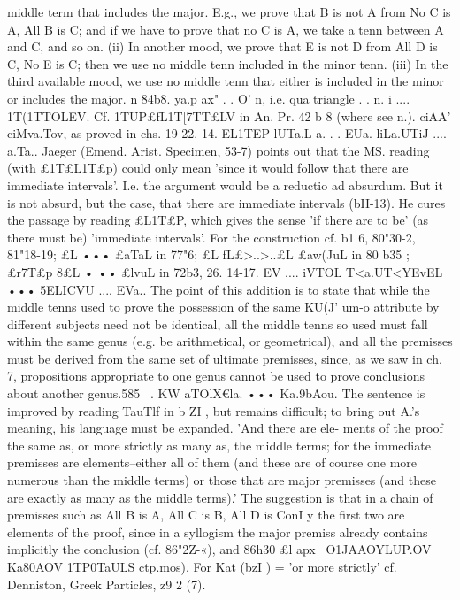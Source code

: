 {{{{{{{{{{{{{{{{{{{{{{{{{{{{{{middle term that includes the major. E.g., we prove that B is
not A from No C is A, All B is C; and if we have to prove that
no C is A, we take a tenn between A and C, and so on. (ii) In
another mood, we prove that E is not D from All D is C, No E is
C; then we use no middle tenn included in the minor tenn. (iii)
In the third available mood, we use no middle tenn that either
is included in the minor or includes the major.
n
84b8. ya.p ax" . . O' n, i.e. qua triangle .
. n. i .... 1T(1TTOLEV. Cf. 1TUP£fL1T[7TT£LV in An. Pr. 42 b 8 (where see n.).
ciAA' ciMva.Tov, as proved in chs. 19-22.
14. EL1TEP lUTa.L a. . . EUa. liLa.UTiJ .... a.Ta.. Jaeger (Emend. Arist.
Specimen, 53-7) points out that the MS. reading (with £1T£L1T£p)
could only mean 'since it would follow that there are immediate
intervals'. I.e. the argument would be a reductio ad absurdum.
But it is not absurd, but the case, that there are immediate
intervals (bII-13). He cures the passage by reading £L1T£P, which
gives the sense 'if there are to be' (as there must be) 'immediate
intervals'. For the construction cf. b1 6, 80"30-2, 81"18-19; £L •••
£aTaL in 77"6; £L fL£>..>..£L £aw(JuL in 80 b35 ; £r7T£p 8£L • •• £lvuL in 72b3, 26.
14-17. EV .... iVTOL T<\I a.UT<\I YEvEL ••• 5ELICVU .... EVa.. The point of
this addition is to state that while the middle tenns used to prove
the possession of the same KU(J' um-o attribute by different subjects
need not be identical, all the middle tenns so used must fall
within the same genus (e.g. be arithmetical, or geometrical),
and all the premisses must be derived from the same set of ultimate
premisses, since, as we saw in ch. 7, propositions appropriate to one
genus cannot be used to prove conclusions about another genus.585
~.
KW aTOlX€la. ••• Ka.9bAou. The sentence is improved by
reading TauTlf in b ZI , but remains difficult; to bring out A.'s
meaning, his language must be expanded. 'And there are ele-
ments of the proof the same as, or more strictly as many as, the
middle terms; for the immediate premisses are elements--either
all of them (and these are of course one more numerous than the
middle terms) or those that are major premisses (and these are
exactly as many as the middle terms).' The suggestion is that in
a chain of premisses such as All B is A, All C is B, All D is ConI y
the first two are elements of the proof, since in a syllogism the
major premiss already contains implicitly the conclusion (cf.
86"2Z-«), and 86h30 £l apx~ O1JAAOYLUP.OV ~ Ka80AOV 1TP0TaULS ctp.mos).
For Kat (bzI ) = 'or more strictly' cf. Denniston, Greek Particles,
z9 2 (7).
}}}}}}}}}}}}}}}}}}}}}}}}}}}}}}
